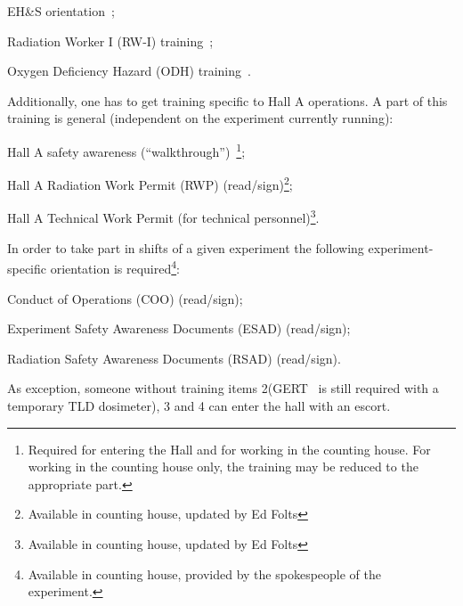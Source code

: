  \begin{list}{.~}{\setlength{\itemsep}{-0.2cm}}    
    \item EH\&S orientation~\cite{EHScebaf};
    \item Radiation Worker I (RW-I) training~\cite{RWIcebaf};
    \item Oxygen Deficiency Hazard (ODH) training~\cite{ODHcebaf}.
    \setcounter{enumtmp1}{\value{enumtmp}}
 \end{list}
\noindent{}Additionally, one has to get training specific to
 Hall A operations. A part of this training is general
(independent on the experiment currently running):
 \begin{list}{.~}{\setlength{\itemsep}{-0.2cm}}    
    \setcounter{enumtmp}{\value{enumtmp1}}
    \item Hall A safety awareness (``walkthrough'')~\cite{SAThalla}\footnote{Required
          for entering the Hall and for working in the counting house.
         For working in the counting house only, the training may be reduced
        to the appropriate part.};
    \item Hall A Radiation Work Permit (RWP) (read/sign)\footnote{Available in counting house,
          updated by Ed Folts};
    \item Hall A Technical Work Permit  (for technical personnel)\footnote{Available in counting house,
          updated by Ed Folts}.
    \setcounter{enumtmp1}{\value{enumtmp}}
 \end{list}
\noindent{}In order to take part in shifts of a given experiment the following
  experiment-specific orientation is required\footnote{Available in counting house, 
   provided by the spokespeople of the experiment.}:
 \begin{list}{.~}{\setlength{\itemsep}{-0.2cm}}    
    \setcounter{enumtmp}{\value{enumtmp1}}
    \item Conduct of Operations (COO) (read/sign);
    \item Experiment Safety Awareness Documents (ESAD) (read/sign);
    \item Radiation Safety Awareness Documents (RSAD) (read/sign).
 \end{list}
 
As exception, someone without training items 2(GERT~\cite{RWIcebaf} is still required
with a temporary TLD dosimeter),
3 and 4 can enter the hall with an escort. \\

